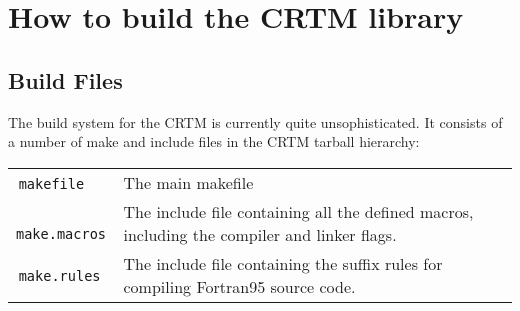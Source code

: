 \chapter{How to build the CRTM library}
\label{sec:build}

\section{Build Files}
The build system for the CRTM is currently quite unsophisticated. It consists of a number of make and include files in the CRTM tarball hierarchy:

\begin{tabular}{l@{ : }p{4.75in}}
  \,\texttt{makefile} & The main makefile\\
  \,\texttt{make.macros} & The include file containing all the defined macros, including the compiler and linker flags.\\
  \,\texttt{make.rules} & The include file containing the suffix rules for compiling Fortran95 source code.\\
\end{tabular}

